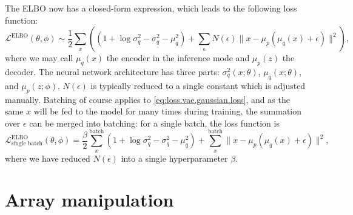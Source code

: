 \documentclass[hyperref, a4paper, 12pt]{report}
\begin{document}
The ELBO now has a closed-form expression, which leads to the following loss function:
\begin{equation}
    \mathcal{L}^{\text{ELBO}}(\theta, \phi) \sim \frac{1}{2} \sum_x 
    \left(
        (1 + \log \sigma_q^2 - \sigma_q^2 - \mu_q^2) + \sum_\epsilon N(\epsilon) \| x - \mu_p(\mu_q(x) + \epsilon) \|^2
    \right),
    \label{eq:loss.vae.gaussian.loss}
\end{equation}
where we may call $\mu_q(x)$ the encoder in the inference mode and $\mu_p(z)$ the decoder.
The neural network architecture has three parts: $\sigma_q^2(x; \theta)$, $\mu_q(x; \theta)$,
and $\mu_p(z; \phi)$.
$N(\epsilon)$ is typically reduced to a single constant which is adjusted manually.
Batching of course applies to \eqref{eq:loss.vae.gaussian.loss},
and as the same $x$ will be fed to the model for many times during training,
the summation over $\epsilon$ can be merged into batching:
for a single batch, the loss function is 
\begin{equation}
    \mathcal{L}^{\text{ELBO}}_{\text{single batch}}(\theta, \phi) 
    = \frac{\beta}{2} \sum_{x}^{\text{batch}} (1 + \log \sigma_q^2 - \sigma_q^2 - \mu_q^2) 
    + \sum_x^{\text{batch}} \| x - \mu_p(\mu_q(x) + \epsilon) \|^2,
\end{equation}
where we have reduced $N(\epsilon)$ into a single hyperparameter $\beta$. 

\chapter{Array manipulation}

\printbibliography[title=References]
\end{document}
